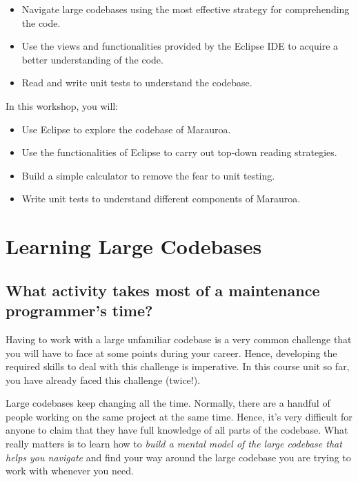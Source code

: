 \documentclass[
]{book}
\providecommand{\tightlist}{%
  \setlength{\itemsep}{0pt}\setlength{\parskip}{0pt}}
\begin{document}
\begin{itemize}
\tightlist
\item
  Navigate large codebases using the most effective strategy for comprehending the code.
\item
  Use the views and functionalities provided by the Eclipse IDE to acquire a better understanding of the code.\\
\item
  Read and write unit tests to understand the codebase.
\end{itemize}

In this workshop, you will:

\begin{itemize}
\tightlist
\item
  Use Eclipse to explore the codebase of Marauroa.
\item
  Use the functionalities of Eclipse to carry out top-down reading strategies.
\item
  Build a simple calculator to remove the fear to unit testing.
\item
  Write unit tests to understand different components of Marauroa.
\end{itemize}

\hypertarget{largecode}{%
\section{Learning Large Codebases}\label{largecode}}

\hypertarget{timesink}{%
\subsection{What activity takes most of a maintenance programmer's time?}\label{timesink}}

Having to work with a large unfamiliar codebase is a very common challenge that you will have to face at some points during your career. Hence, developing the required skills to deal with this challenge is imperative. In this course unit so far, you have already faced this challenge (twice!).

Large codebases keep changing all the time. Normally, there are a handful of people working on the same project at the same time. Hence, it's very difficult for anyone to claim that they have full knowledge of all parts of the codebase. What really matters is to learn how to \emph{build a mental model of the large codebase that helps you navigate} and find your way around the large codebase you are trying to work with whenever you need.
\end{document}
